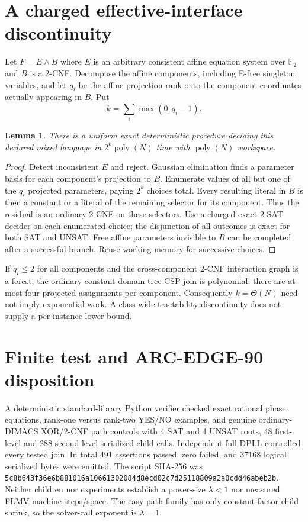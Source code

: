 \documentclass[11pt]{article}
\newtheorem{lemma}[theorem]{Lemma}
\begin{document}
\section{A charged effective-interface discontinuity}
Let \(F=E\land B\) where \(E\) is an arbitrary consistent
affine equation system over \(\mathbb F_2\) and \(B\)
is a 2-CNF. Decompose the affine components, including
E-free singleton variables, and let \(q_i\) be the affine
projection rank onto the component coordinates actually
appearing in \(B\). Put
\[
 k=\sum_i\max(0,q_i-1).
\]
\begin{lemma}
There is a uniform exact deterministic procedure deciding
this declared mixed language in
\(2^k\operatorname{poly}(N)\) time with
\(\operatorname{poly}(N)\) workspace.
\end{lemma}
\begin{proof}
Detect inconsistent \(E\) and reject. Gaussian elimination
finds a parameter basis for each component's projection
to \(B\). Enumerate values of all but one of the
\(q_i\) projected parameters, paying \(2^k\) choices
total. Every resulting literal in \(B\) is then a constant
or a literal of the remaining selector for its component.
Thus the residual is an ordinary 2-CNF on these selectors.
Use a charged exact 2-SAT decider on each enumerated
choice; the disjunction of all outcomes is exact for both
SAT and UNSAT. Free affine parameters invisible to \(B\)
can be completed after a successful branch. Reuse working
memory for successive choices.
\end{proof}
If \(q_i\le2\) for all components and the
cross-component 2-CNF interaction graph is a forest,
the ordinary constant-domain tree-CSP join is polynomial:
there are at most four projected assignments per component.
Consequently \(k=\Theta(N)\) need not imply exponential
work. A class-wide tractability discontinuity does not
supply a per-instance lower bound.
\section{Finite test and ARC-EDGE-90 disposition}
A deterministic standard-library Python verifier checked
exact rational phase equations, rank-one versus rank-two
YES/NO examples, and genuine ordinary-DIMACS
XOR/2-CNF path controls with 4 SAT and 4 UNSAT roots,
48 first-level and 288 second-level serialized child calls.
Independent full DPLL controlled every tested join. In
total 491 assertions passed, zero failed, and 37168
logical serialized bytes were emitted. The script
SHA-256 was
\texttt{5c8b643f36e6b881016a10661302084d8ecd02c7d25118809a2a0cdd46abeb2b}.
Neither children nor experiments establish a power-size
\(\lambda<1\) nor measured FLMV machine steps/space.
The easy path family has only constant-factor child shrink,
so the solver-call exponent is \(\lambda=1\).
\end{document}
